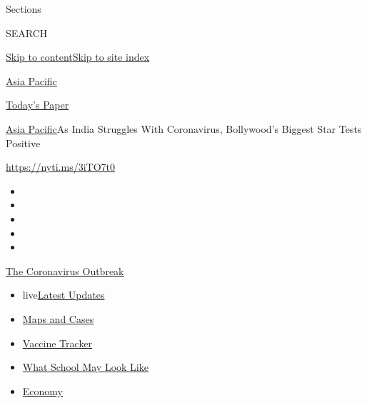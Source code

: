 Sections

SEARCH

\protect\hyperlink{site-content}{Skip to
content}\protect\hyperlink{site-index}{Skip to site index}

\href{https://www.nytimes.com/section/world/asia}{Asia Pacific}

\href{https://myaccount.nytimes.com/auth/login?response_type=cookie\&client_id=vi}{}

\href{https://www.nytimes.com/section/todayspaper}{Today's Paper}

\href{/section/world/asia}{Asia Pacific}\textbar{}As India Struggles
With Coronavirus, Bollywood's Biggest Star Tests Positive

\url{https://nyti.ms/3iTO7t0}

\begin{itemize}
\item
\item
\item
\item
\item
\end{itemize}

\href{https://www.nytimes.com/news-event/coronavirus?action=click\&pgtype=Article\&state=default\&region=TOP_BANNER\&context=storylines_menu}{The
Coronavirus Outbreak}

\begin{itemize}
\tightlist
\item
  live\href{https://www.nytimes.com/2020/08/02/world/coronavirus-updates.html?action=click\&pgtype=Article\&state=default\&region=TOP_BANNER\&context=storylines_menu}{Latest
  Updates}
\item
  \href{https://www.nytimes.com/interactive/2020/us/coronavirus-us-cases.html?action=click\&pgtype=Article\&state=default\&region=TOP_BANNER\&context=storylines_menu}{Maps
  and Cases}
\item
  \href{https://www.nytimes.com/interactive/2020/science/coronavirus-vaccine-tracker.html?action=click\&pgtype=Article\&state=default\&region=TOP_BANNER\&context=storylines_menu}{Vaccine
  Tracker}
\item
  \href{https://www.nytimes.com/interactive/2020/07/29/us/schools-reopening-coronavirus.html?action=click\&pgtype=Article\&state=default\&region=TOP_BANNER\&context=storylines_menu}{What
  School May Look Like}
\item
  \href{https://www.nytimes.com/live/2020/07/31/business/stock-market-today-coronavirus?action=click\&pgtype=Article\&state=default\&region=TOP_BANNER\&context=storylines_menu}{Economy}
\end{itemize}


